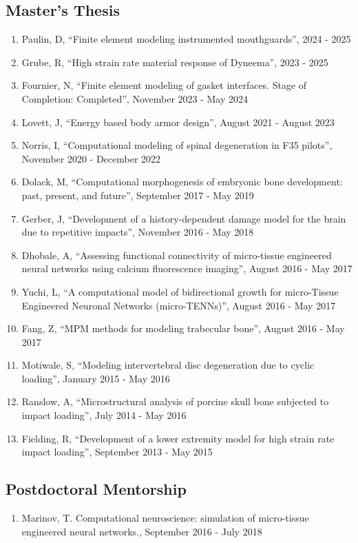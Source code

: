 \documentclass[a4paper,10pt]{article}
\begin{document}
\subsection*{Master's Thesis}
\begin{enumerate}
\item Paulin, D, ``Finite element modeling instrumented mouthguards'', 2024 - 2025
\item Grube, R, ``High strain rate material response of Dyneema'', 2023 - 2025
\item Fournier, N, ``Finite element modeling of gasket interfaces. Stage of Completion: Completed'', November 2023 - May 2024
\item Lovett, J, ``Energy based body armor design'', August 2021 - August 2023
\item Norris, I, ``Computational modeling of spinal degeneration in F35 pilots'', November 2020 - December 2022
\item Dolack, M, ``Computational morphogenesis of embryonic bone development: past, present, and future'', September 2017 - May 2019
\item Gerber, J, ``Development of a history-dependent damage model for the brain due to repetitive impacts'', November 2016 - May 2018
\item Dhobale, A, ``Assessing functional connectivity of micro-tissue engineered neural networks using calcium fluorescence imaging'', August 2016 - May 2017
\item Yuchi, L, ``A computational model of bidirectional growth for micro-Tissue Engineered Neuronal Networks (micro-TENNs)'', August 2016 - May 2017
\item Fang, Z, ``MPM methods for modeling trabecular bone'', August 2016 - May 2017
\item Motiwale, S, ``Modeling intervertebral disc degeneration due to cyclic loading'', January 2015 - May 2016
\item Ranslow, A, ``Microstructural analysis of porcine skull bone subjected to impact loading'', July 2014 - May 2016
\item Fielding, R, ``Development of a lower extremity model for high strain rate impact loading'', September 2013 - May 2015
\end{enumerate}

\subsection*{Postdoctoral Mentorship}
\begin{enumerate}
\item Marinov, T. Computational neuroscience: simulation of micro-tissue engineered neural networks., September 2016 - July 2018
\end{enumerate}
\end{document}
